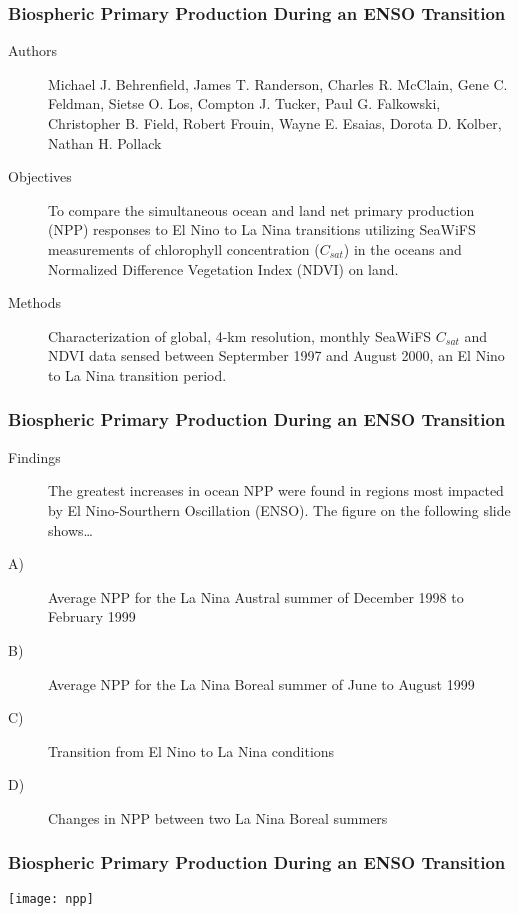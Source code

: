\begin{frame}\frametitle{Biospheric Primary Production During an ENSO Transition} 
\begin{description}
    \item[Authors] Michael J. Behrenfield, James T. Randerson, Charles R. McClain, Gene C. Feldman, Sietse O. Los, Compton J. Tucker, Paul G. Falkowski, Christopher B. Field, Robert Frouin, Wayne E. Esaias, Dorota D. Kolber, Nathan H. Pollack
    \item[Objectives] To compare the simultaneous ocean and land net primary production (NPP) responses to El Nino to La Nina transitions utilizing SeaWiFS measurements of chlorophyll concentration ($C_{sat}$) in the oceans and Normalized Difference Vegetation Index (NDVI) on land.
    \item[Methods] Characterization of global, 4-km resolution, monthly SeaWiFS $C_{sat}$ and NDVI data sensed between Septermber 1997 and August 2000, an El Nino to La Nina transition period.
\end{description}
\end{frame}

\begin{frame}\frametitle{Biospheric Primary Production During an ENSO Transition} 
\begin{description}
    \item[Findings] The greatest increases in ocean NPP were found in regions most impacted by El Nino-Sourthern Oscillation (ENSO). The figure on the following slide shows\ldots
    \item[A)] Average NPP for the La Nina Austral summer of December 1998 to February 1999
    \item[B)] Average NPP for the La Nina Boreal summer of June to August 1999
    \item[C)] Transition from El Nino to La Nina conditions
    \item[D)] Changes in NPP between two La Nina Boreal summers
\end{description}
\end{frame}

\begin{frame}\frametitle{Biospheric Primary Production During an ENSO Transition} 
    \begin{center}
        \texttt{[image: npp]}
    \end{center}
\end{frame}

